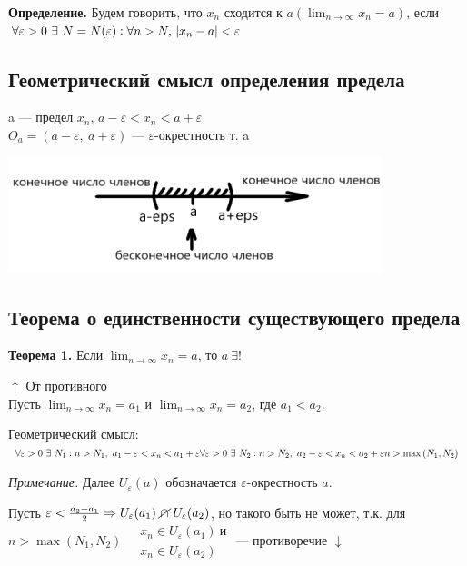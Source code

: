 \documentclass{article}
\begin{document}
    \textbf{Определение.} Будем говорить, что \( x_n \) сходится к \( a(\lim_{n \to \infty} x_n = a) \), если \( \forall \varepsilon > 0 \ \exists \  N = N(\varepsilon): \forall n > N,\ \abs{x_n - a} < \varepsilon \)
    
    \subsection{Геометрический смысл определения предела}
    
    a --- предел \( x_n \), \(a - \varepsilon < x_n < a + \varepsilon\)\\
	\(O_a = (a - \varepsilon,\ a + \varepsilon)\) --- \(\varepsilon\)-окрестность т. a

	\includegraphics[scale=0.7]{21_0}
    
    \subsection{Теорема о единственности существующего предела}
    
    \textbf{Теорема 1.} Если \(\lim_{n \rightarrow \infty}{x_n} = a\), то \(a\ \exists !\)
    
    \(\uparrow\) От противного
    \\ Пусть \(\lim_{n \rightarrow \infty}{x_n} = a_1\) и \(\lim_{n \rightarrow \infty}{x_n} = a_2\), где \( a_1 < a_2\).
    
    Геометрический смысл:\\
    \(\forall \varepsilon > 0 \ \exists \  N_1 : n > N_1,\ a_1 - \varepsilon < x_n < a_1 + \varepsilon\\ \forall \varepsilon > 0 \ \exists \  N_2 : n > N_2,\ a_2 - \varepsilon < x_n < a_2 + \varepsilon
    \\ n > \max{(N_1, N_2)}\)
    
    \textit{Примечание.} Далее $U_{\varepsilon}(a)$ обозначается $\varepsilon$-окрестность $a$.

    Пусть \(\varepsilon < \frac{a_2 - a_1}{2} \Rightarrow U_{\varepsilon}(a_1)\ \cancel{\cap}\ U_{\varepsilon}(a_2)\), но такого быть не может, т.к. для \(n > \max{(N_1, N_2)}\
    \begin{aligned}
    	&x_n \in U_{\varepsilon}(a_1)\ \textrm{и}\\
        &x_n \in U_{\varepsilon}(a_2)
    \end{aligned}\) --- противоречие \(\downarrow\)
    
\end{document}
